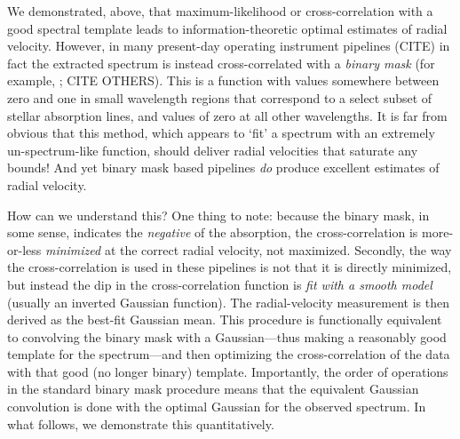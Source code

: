 \documentclass[modern]{aastex631}
\begin{document}
We demonstrated, above, that maximum-likelihood or cross-correlation with a good spectral template leads to information-theoretic optimal estimates of radial velocity.
However, in many present-day operating instrument pipelines (CITE) in fact the extracted spectrum is instead cross-correlated with a \emph{binary mask} (for example, \citealt{pepe}; CITE OTHERS).
This is a function with values somewhere between zero and one in small wavelength regions that correspond to a select subset of stellar absorption lines, and values of zero at all other wavelengths. 
It is far from obvious that this method, which appears to `fit' a spectrum with an extremely un-spectrum-like function, should deliver radial velocities that saturate any bounds!
And yet binary mask based pipelines \emph{do} produce excellent estimates of radial velocity.

How can we understand this?
One thing to note: because the binary mask, in some sense, indicates the \emph{negative} of the absorption, the cross-correlation is more-or-less \emph{minimized} at the correct radial velocity, not maximized.
Secondly, the way the cross-correlation is used in these pipelines is not that it is directly minimized, but instead the dip in the cross-correlation function is \emph{fit with a smooth model} (usually an inverted Gaussian function).
The radial-velocity measurement is then derived as the best-fit Gaussian mean.
This procedure is functionally equivalent to convolving the binary mask with a Gaussian---thus making a reasonably good template for the spectrum---and then optimizing the cross-correlation of the data with that good (no longer binary) template. 
Importantly, the order of operations in the standard binary mask procedure means that the equivalent Gaussian convolution is done with the optimal Gaussian for the observed spectrum.
In what follows, we demonstrate this quantitatively.
\end{document}
